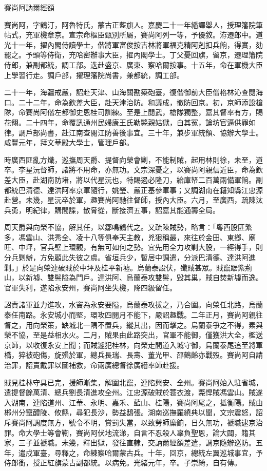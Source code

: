 
\begin{pinyinscope}
賽尚阿訥爾經額

賽尚阿，字鶴汀，阿魯特氏，蒙古正藍旗人。嘉慶二十一年繙譯舉人，授理籓院筆帖式，充軍機章京。宣宗命樞臣甄別所屬，賽尚阿列一等，予優敘。洊遷郎中。道光十一年，擢內閣侍讀學士，偕將軍富俊按吉林將軍福克精阿剋扣兵餉，得實，劾罷之。予頭等侍衛，充哈密辦事大臣，擢內閣學士。丁父憂回旗，留京，遷理籓院侍郎，兼副都統，調工部。迭赴盛京、廣東、察哈爾按事。十五年，命在軍機大臣上學習行走。調戶部，擢理籓院尚書，兼都統，調工部。

二十一年，海疆戒嚴，詔赴天津、山海關勘築砲臺，復偕御前大臣僧格林沁查閱海口。二十二年，命為欽差大臣，赴天津治防。和議成，撤防回京。初，京師添設槍隊，命賽尚阿偕左都御史恩桂司訓練。至是上閱武，槍隊獨整，嘉其督率有方，賜花翎。二十四年，命覆訊通州民婦康王氏勒斃親姑獄，白其冤，論坊官逼供罪如律。調戶部尚書，赴江南查閱江防善後事宜。三十年，兼步軍統領、協辦大學士。咸豐元年，拜文華殿大學士，管理戶部。

時廣西匪亂方熾，巡撫周天爵、提督向榮會剿，不能制賊，起用林則徐，未至，道卒。李星沅督師，諸將不用命，亦無功。文宗深憂之，以賽尚阿親信近臣，命為欽差大臣，赴湖南防堵，將以代星沅也，特賜遏必隆刀，給庫帑二百萬兩備軍餉。副都統巴清德、達洪阿率京軍隨行，姚瑩、嚴正基參軍事；又調湖南在籍知縣江忠源赴營。未幾，星沅卒於軍，趣賽尚阿馳往督師，授內大臣。六月，至廣西，疏陳汰兵勇，明紀律，購間諜，散脅從，斷接濟五事，詔嘉其能通籌全局。

周天爵與向榮不協，解其任，以鄒鳴鶴代之。又疏陳賊勢，略言：「粵西股匪繁多，馮雲山、洪秀全、凌十八等俱奉天主教，兇狠稱最，來往於金田、東鄉、廟旺、中坪，官兵壁上環觀，有無可如何之勢。宜先用全力攻剿大股，一經得手，則分兵剿辦，方免顧此失彼之虞。省垣兵少，暫居中調遣，分派巴清德、達洪阿進剿。」於是向榮連破賊於中坪及桂平新墟。烏蘭泰設伏，殲賊甚眾。賊竄踞紫荊山，以新墟、雙髻隘為門戶。達洪阿、烏蘭泰攻雙髻，毀其巢，賊自焚新墟而逸。官軍失利，遂陷永安州，賽尚阿坐失機，降四級留任。

詔責諸軍並力進攻，水竇為永安要隘，烏蘭泰攻拔之，乃合圍。向榮任北路，烏蘭泰任南路。永安城小而堅，環攻四閱月不能下，嚴詔趣戰。二年正月，賽尚阿親往督之，用向榮策，缺城北一隅不置兵，縱其出，因而擊之。烏蘭泰爭之不得，素與榮不協，至是益相水火。二月，賊果由此路突出，官軍不能御，僅獲洪大全，檻送京師，以收復永安上聞；而賊遽犯桂林，向榮走間道入城守御，烏蘭泰尾追至將軍橋，猝被砲傷，旋殞於軍，總兵長瑞、長壽、董光甲、邵鶴齡亦戰歿。賽尚阿自請治罪，詔責戴罪以圖補救，命兩廣總督徐廣縉率師赴援。

賊見桂林守具已完，援師漸集，解圍北竄，連陷興安、全州。賽尚阿始入駐省城，遣提督餘萬清、總兵劉長清進攻全州。江忠源破賊於蓑衣渡，斃悍賊馮雲山。賊遂入湖南，連陷道州、江華、永明、嘉禾、藍山、桂陽，賽尚阿尾之，抵衡陽。賊由郴州分竄醴陵、攸縣，尋犯長沙，勢益鴟張。湖南巡撫羅繞典以聞，文宗震怒，詔斥賽尚阿調度無方，號令不明，賞罰失當，以致勞師糜餉，日久無功，褫職逮京治罪。命大學士等會鞫，賽尚阿伏地流涕，自言不忍殺人辜負聖恩，論大闢，籍其家，三子並褫職。未幾，釋出獄，發往直隸，交訥爾經額差遣，調京隨辦巡防。五年，遣戍軍臺，尋釋之，命練察哈爾蒙古兵。十年，回京，總統左翼巡城事宜，予侍郎銜，授正紅旗蒙古副都統。以病免。光緒元年，卒。子崇綺，自有傳。


\end{pinyinscope}

